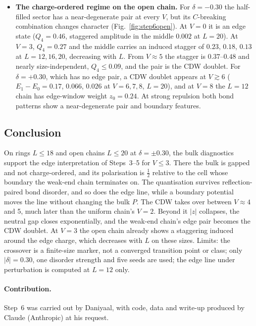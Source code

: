 \documentclass[11pt,a4paper]{article}
\begin{document}
\begin{itemize}
  \item \textbf{The charge-ordered regime on the open chain.} For $\delta=-0.30$ the half-filled sector has a near-degenerate pair at every $V$, but its $C$-breaking combination changes character (Fig.~\ref{fig:step6open}). At $V=0$ it is an edge state ($Q_4=0.46$, staggered amplitude in the middle $0.002$ at $L=20$). At $V=3$, $Q_4=0.27$ and the middle carries an induced stagger of $0.23$, $0.18$, $0.13$ at $L=12,16,20$, decreasing with $L$. From $V\approx5$ the stagger is $0.37$--$0.48$ and nearly size-independent, $Q_4\le0.09$, and the pair is the CDW doublet. For $\delta=+0.30$, which has no edge pair, a CDW doublet appears at $V\gtrsim6$ ($E_1-E_0=0.17$, $0.066$, $0.026$ at $V=6,7,8$, $L=20$), and at $V=8$ the $L=12$ chain has edge-window weight $z_0=0.24$. At strong repulsion both bond patterns show a near-degenerate pair and boundary features.
\end{itemize}

\subsection{Conclusion}

On rings $L\le18$ and open chains $L\le20$ at $\delta=\pm0.30$, the bulk diagnostics support the edge interpretation of Steps~3--5 for $V\le3$.
There the bulk is gapped and not charge-ordered, and its polarisation is $\tfrac12$ relative to the cell whose boundary the weak-end chain terminates on.
The quantisation survives reflection-paired bond disorder, and so does the edge line, while a boundary potential moves the line without changing the bulk $P$.
The CDW takes over between $V\approx4$ and 5, much later than the uniform chain's $V=2$.
Beyond it $|z|$ collapses, the neutral gap closes exponentially, and the weak-end chain's edge pair becomes the CDW doublet.
At $V=3$ the open chain already shows a staggering induced around the edge charge, which decreases with $L$ on these sizes.
Limits: the crossover is a finite-size marker, not a converged transition point or class; only $|\delta|=0.30$, one disorder strength and five seeds are used; the edge line under perturbation is computed at $L=12$ only.

\paragraph{Contribution.} Step~6 was carried out by Daniyaal, with code, data and write-up produced by Claude (Anthropic) at his request.
\end{document}
